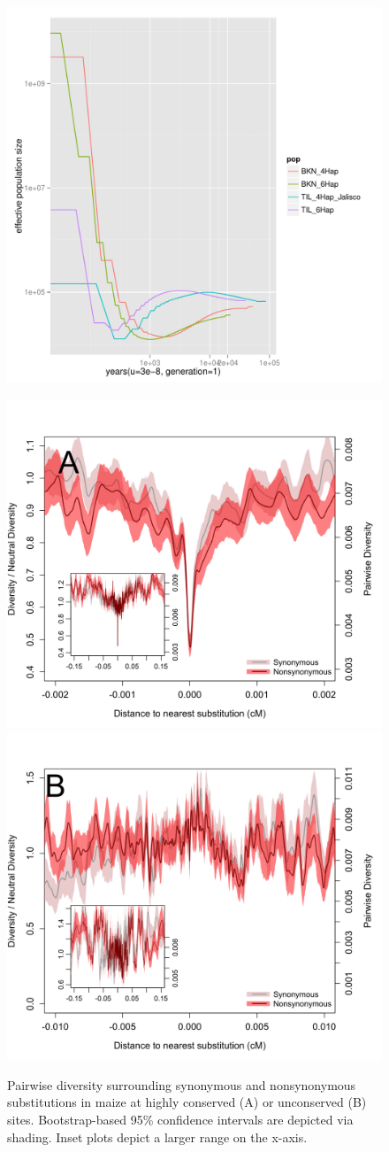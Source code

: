 \begin{figure}
  \begin{center}
    \includegraphics[width=.85\textwidth]{FigsAndFiles/BKN.TIL.msmc.pdf} \\
    \end{center}
\caption{ \label{sFig:msmc}}
\end{figure}
\clearpage


\begin{figure}
  \includegraphics[width=.5\textwidth]{FigsAndFiles/plotDiversity_TvM_Conserved_Significance_June.png}
  \includegraphics[width=.5\textwidth]{FigsAndFiles/plotDiversity_TvM_Unconserved_Significance_June.png}
\caption{ Pairwise diversity surrounding synonymous and nonsynonymous
  substitutions in maize at highly conserved (A) or unconserved (B) sites.  Bootstrap-based 95\% confidence intervals are depicted via shading. Inset plots depict a larger range on the x-axis. \label{sFig:consUncons}}
\end{figure}
\clearpage

